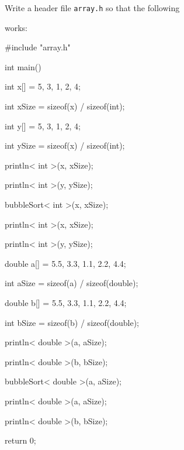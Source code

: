 Write a header file \texttt{array.h} so that the following

works:



\begin{consolethree}[escapeinside=||]

#include "array.h"



int main()

{

    int x[] = {5, 3, 1, 2, 4};

    int xSize = sizeof(x) / sizeof(int);

    int y[] = {5, 3, 1, 2, 4};

    int ySize = sizeof(x) / sizeof(int);



    println< int >(x, xSize);

    println< int >(y, ySize);

    bubbleSort< int >(x, xSize);

    println< int >(x, xSize);

    println< int >(y, ySize);



    double a[] = {5.5, 3.3, 1.1, 2.2, 4.4};

    int aSize = sizeof(a) / sizeof(double);

    double b[] = {5.5, 3.3, 1.1, 2.2, 4.4};

    int bSize = sizeof(b) / sizeof(double);



    println< double >(a, aSize);

    println< double >(b, bSize);

    bubbleSort< double >(a, aSize);

    println< double >(a, aSize);

    println< double >(b, bSize);

    return 0;

}

\end{consolethree}

